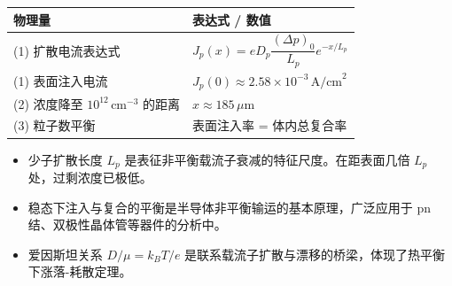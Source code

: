 \begin{formulabox}[答案汇总]
\begin{center}
\begin{tabular}{ll}
\toprule
\textbf{物理量} & \textbf{表达式 / 数值} \\
\midrule
(1) 扩散电流表达式 & $J_p(x)=eD_p\dfrac{(\Delta p)_0}{L_p}e^{-x/L_p}$ \\
(1) 表面注入电流 & $J_p(0)\approx2.58\times10^{-3}\,\text{A/cm}^2$ \\
(2) 浓度降至 $10^{12}\,\text{cm}^{-3}$ 的距离 & $x\approx185\,\mu\text{m}$ \\
(3) 粒子数平衡 & 表面注入率 = 体内总复合率 \\
\bottomrule
\end{tabular}
\end{center}
\end{formulabox}

\begin{insightbox}[物理图像]
\begin{itemize}
    \item 少子扩散长度 $L_p$ 是表征非平衡载流子衰减的特征尺度。在距表面几倍 $L_p$ 处，过剩浓度已极低。
    \item 稳态下注入与复合的平衡是半导体非平衡输运的基本原理，广泛应用于 pn 结、双极性晶体管等器件的分析中。
    \item 爱因斯坦关系 $D/\mu=k_BT/e$ 是联系载流子扩散与漂移的桥梁，体现了热平衡下涨落-耗散定理。
\end{itemize}
\end{insightbox}
